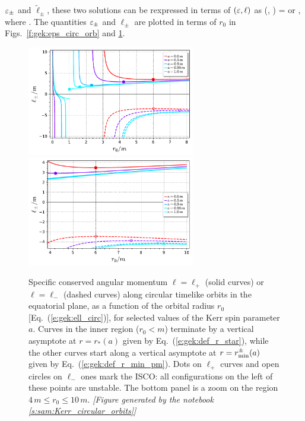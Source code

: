 $\varepsilon_\pm$ and $\tilde{\ell}_\pm$, these two solutions
can be rexpressed in terms of $(\varepsilon,\ell)$ as
\be \label{e:gek:circ_two_sol}
    (\veps, \ell) = \encadre{ (\veps_+, \ell_+)}\quad\mbox{or}\quad
    \encadre{(\veps_-, \ell_-)} ,
\ee
where
\be \label{e:gek:ell_circ}
     .
\ee
The quantities $\varepsilon_\pm$ and $\ell_\pm$ are plotted in terms of $r_0$ in
Figs.~\ref{f:gek:eps_circ_orb} and \ref{f:gek:ell_circ_orb}.
\begin{figure}
\begin{center}
\includegraphics[width=0.65\textwidth]{gek_ell_circ_orb.pdf}\\
\includegraphics[width=0.65\textwidth]{gek_ell_circ_orb_zoom.pdf}
\end{center}
\caption[]{\label{f:gek:ell_circ_orb} \footnotesize
Specific conserved angular momentum $\ell=\ell_+$ (solid curves) or $\ell=\ell_-$
(dashed curves) along circular timelike
orbits in the equatorial plane, as a function of the orbital radius $r_0$
[Eq.~(\ref{e:gek:ell_circ})], for selected values of the Kerr spin parameter $a$.
Curves in the inner region ($r_0 < m$) terminate by a vertical asymptote at $r = r_*(a)$ given
by Eq.~(\ref{e:gek:def_r_star}), while the other curves start along a
vertical asymptote at $r = r_{\rm min}^\pm(a)$ given by Eq.~(\ref{e:gek:def_r_min_pm}).
Dots on $\ell_+$ curves and open circles on $\ell_-$ ones mark the ISCO: all
configurations on the left of these points are unstable.
The bottom panel is a zoom on the region $4\,m \leq r_0 \leq 10\,m$.
\textsl{[Figure generated by the notebook \ref{s:sam:Kerr_circular_orbits}]}
}
\end{figure}
